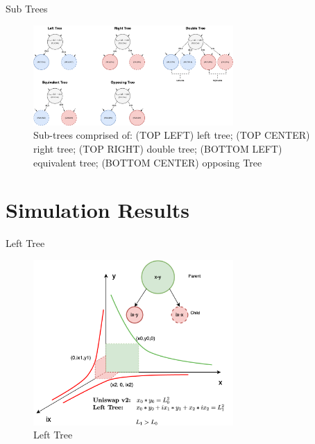 \documentclass[10pt,xcolor=svgnames]{beamer} %
\begin{document}
\begin{frame}{Sub Trees} 

\begin{figure}[h!]
\includegraphics[width=3in]{img/sub_trees.png}
\caption{Sub-trees comprised of: (TOP LEFT) left tree; (TOP CENTER) right tree; (TOP RIGHT) double tree; (BOTTOM LEFT) equivalent tree; (BOTTOM CENTER) opposing Tree} 
\label{fig:sub_trees}
\end{figure}

\end{frame}


\section{Simulation Results}

\begin{frame}{Left Tree}

\begin{figure}[h!]
\includegraphics[width=3in]{img/left_tree.png}
\caption{Left Tree} 
\label{fig:left_tree}
\end{figure}

\end{frame}
\end{document}
